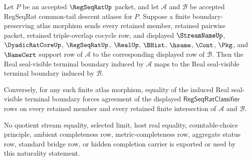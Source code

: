 \begin{theorem}
\label{thm:regseqrat-common-tail-descent-atlas-boundary-naturality}
Let $P$ be an accepted $\RegSeqRatUp$ packet, and let $\mathcal A$ and $\mathcal B$ be accepted RegSeqRat common-tail descent atlases for $P$. Suppose a finite boundary-preserving atlas morphism sends every retained member, retained pairwise packet, retained triple-overlap cocycle row, and displayed $\StreamNameUp$, $\DyadicRatCoreUp$, $\RegSeqRatUp$, $\RealUp$, $\BHist$, $\hsame$, $\Cont$, $\Pkg$, and $\NameCert$ support row of $\mathcal A$ to the corresponding displayed row of $\mathcal B$. Then the Real seal-visible terminal boundary induced by $\mathcal A$ maps to the Real seal-visible terminal boundary induced by $\mathcal B$.

Conversely, for any such finite atlas morphism, equality of the induced Real seal-visible terminal boundary forces agreement of the displayed $\mathsf{RegSeqRatClassifier}$ rows on every retained member and every retained finite intersection of $\mathcal A$ and $\mathcal B$.

No quotient stream equality, selected limit, host real equality, countable-choice principle, ambient completeness row, metric-completeness row, aggregate status row, standard bridge row, or hidden completion carrier is exported or used by this naturality statement.
\end{theorem}
